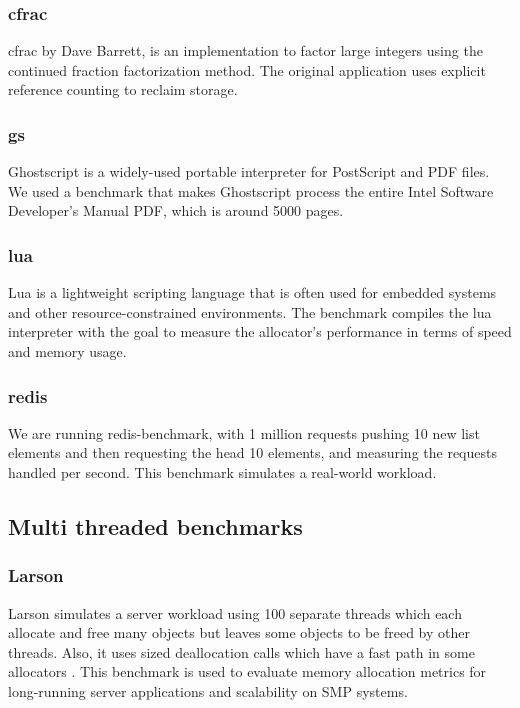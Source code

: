 \documentclass[sigplan,screen]{acmart}
\begin{document}
\subsubsection{cfrac}
cfrac by Dave Barrett, is an implementation to factor large integers using the continued fraction factorization method. The original application uses explicit reference counting to reclaim storage\cite{gay1998memory}.

\subsubsection{gs}
Ghostscript is a widely-used portable interpreter for PostScript\cite{johnstone1998memory} and PDF files. We used a benchmark that makes Ghostscript process the entire Intel Software Developer’s Manual PDF, which is around 5000 pages.

\subsubsection{lua}
Lua is a lightweight scripting language that is often used for embedded systems and other resource-constrained environments. The benchmark compiles the lua interpreter with the goal to measure the allocator's performance in terms of speed and memory usage.

\subsubsection{redis}
We are running redis-benchmark, with 1 million requests pushing 10 new list elements and then requesting the head 10 elements, and measuring the requests handled per second. This benchmark simulates a real-world workload.

\subsection{Multi threaded benchmarks}

\subsubsection{Larson}
Larson simulates a server workload using 100 separate threads which each allocate and free many objects but leaves some objects to be freed by other threads. Also, it uses sized deallocation calls which have a fast path in some allocators \cite{larson1998memory}. This benchmark is used to evaluate memory allocation metrics for long-running  server  applications and scalability on SMP systems.
\end{document}
